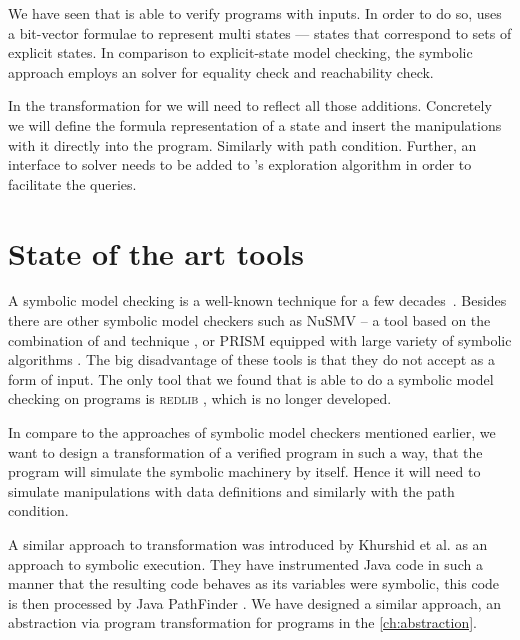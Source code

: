 \begin{summary}
We have seen that \SymDIVINE is able to verify programs with inputs. In order to
do so, \SymDIVINE uses a bit-vector formulae to represent multi states ---
states that correspond to sets of explicit states. In comparison to
explicit-state model checking, the symbolic approach employs an \SMT solver for
equality check and reachability check.

In the transformation for \DIVINE we will need to reflect all those additions.
Concretely we will define the formula representation of a state and insert
the manipulations with it directly into the program. Similarly with path
condition.  Further, an interface to \SMT solver needs to be added to
\DIVINE's exploration algorithm in order to facilitate the \SMT queries.
\end{summary}

\section{State of the art tools}

A symbolic model checking is a well-known technique for a few
decades~\cite{McMillan93}. Besides \SymDIVINE there are other symbolic
model checkers such as NuSMV -- a tool based on the combination of \SMT and \BDD
technique \cite{Cimatti20}, or PRISM equipped with large variety of symbolic
algorithms \cite{Kwiatkowska20}. The big disadvantage of these tools is that
they do not accept \Cpp{} as a form of input. The only tool that we found that
is able to do a symbolic model checking on \Cpp{} programs is \textsc{redlib}
\cite{redlib}, which is no longer developed.

In compare to the approaches of symbolic model checkers mentioned earlier, we
want to design a transformation of a verified program in such a way, that the
program will simulate the symbolic machinery by itself. Hence it will need to
simulate manipulations with data definitions and similarly with the path
condition.

A similar approach to transformation was introduced by Khurshid et al.
\cite{Khurshid03} as an approach to symbolic execution. They have instrumented
Java code in such a manner that the resulting code behaves as its variables were
symbolic, this code is then processed by Java PathFinder \cite{Havelund20}. We
have designed a similar approach, an abstraction via program transformation for
\LLVM programs in the \autoref{ch:abstraction}.



